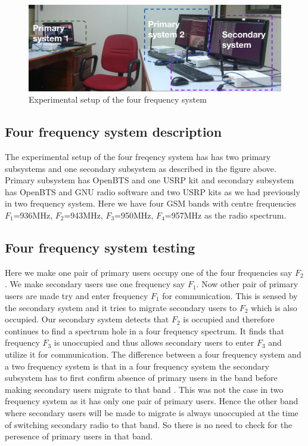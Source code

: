 \begin{figure}
\centering
\includegraphics[width=1\textwidth]{../images/freq4}
\caption[Experimental setup, 4-frequency system]{Experimental setup of the four
 frequency system}
\label{freq4}
\end{figure}

\subsection{Four frequency system description}
 The experimental setup of the four freqency system has 
has two primary subsystems and one secondary subsystem as described in the figure above. Primary subsystem 
has OpenBTS and one USRP kit and secondary subsystem has OpenBTS and GNU radio 
software and two USRP kits as we had previously in two frequency system. 
Here we have four GSM bands with centre frequencies 
$F_1$=936MHz, $F_2$=943MHz, $F_3$=950MHz, $F_4$=957MHz as the radio spectrum.
 



\subsection{Four frequency system testing}
Here we make one pair of primary users occupy one of the four frequencies say 
$F_2$. We make secondary users use one frequency say $F_1$. Now other pair of 
primary users are made try and enter frequency $F_1$ for communication. This is sensed by 
the secondary system and it tries to migrate secondary users to $F_2$ which is 
also occupied. Our secondary system detects that $F_2$ is occupied and therefore 
continues to find a spectrum hole in a four frequency spectrum. It finds that 
frequency $F_3$ is unoccupied and thus allows secondary users to enter $F_3$ 
and utilize it for communication. The difference between a four frequency 
system and a two frequency system is that in a four frequency 
system the secondary subsystem has to first confirm absence of primary users 
in the band before making secondary users migrate to that band . This was not
the case in two frequency system as it has only one 
pair of primary users. Hence the other band where secondary users will be made 
to migrate is always unoccupied at the time of switching secondary radio to 
that band. So there is no need to check for the peresence of primary users in that band.

